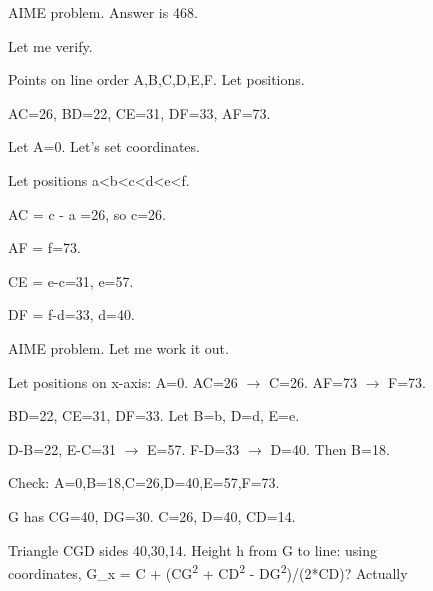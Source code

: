 \begin{figure}[H]
\noindent
\begin{reasoncol}[equal height group=reasX0]
  \par\vspace{1pt}
  \caret{}\par\vspace{4pt}
  \raggedright {} AIME problem. Answer is 468.\par
  Let me verify.\par
  Points on line order A,B,C,D,E,F. Let positions.\par
  AC=26, BD=22, CE=31, DF=33, AF=73.\par
  Let A=0. Let's set coordinates.\par
  Let positions a<b<c<d<e<f.\par
  AC = c - a =26, so c=26.\par
  AF = f=73.\par
  CE = e-c=31, e=57.\par
  DF = f-d=33, d=40.\par\vspace{3pt}\elide
\end{reasoncol}\hspace{\columnsep}%
\vspace{12pt}
\begin{reasoncol}[equal height group=reasX0]
  \par\vspace{1pt}
  \caret{}\par\vspace{4pt}
  \raggedright {} AIME problem. Let me work it out.\par
  Let positions on x-axis: A=0. AC=26 \(\rightarrow\) C=26. AF=73 \(\rightarrow\) F=73.\par
  BD=22, CE=31, DF=33. Let B=b, D=d, E=e.\par
  D-B=22, E-C=31 \(\rightarrow\) E=57. F-D=33 \(\rightarrow\) D=40. Then B=18.\par
  Check: A=0,B=18,C=26,D=40,E=57,F=73.\par
  G has CG=40, DG=30. C=26, D=40, CD=14.\par
  Triangle CGD sides 40,30,14. Height h from G to line: using coordinates, G\_x = C + (CG\textsuperscript{2} + CD\textsuperscript{2} - DG\textsuperscript{2})/(2*CD)? Actually\par\vspace{3pt}\elide
\end{reasoncol}\hspace{\columnsep}%

\end{figure}

